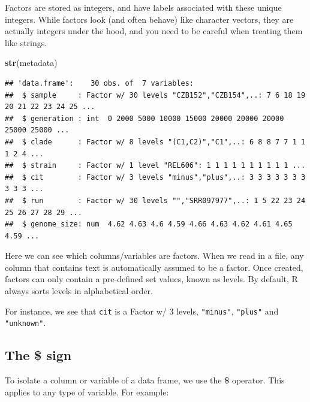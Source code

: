 \documentclass[]{book}
\newenvironment{Shaded}{\begin{snugshade}}{\end{snugshade}}
\newcommand{\KeywordTok}[1]{\textcolor[rgb]{0.13,0.29,0.53}{\textbf{#1}}}
\newcommand{\NormalTok}[1]{#1}
\newcommand{\OperatorTok}[1]{\textcolor[rgb]{0.81,0.36,0.00}{\textbf{#1}}}
\begin{document}
Factors are stored as integers, and have labels associated with these unique integers. While factors look (and often behave) like character vectors, they are actually integers under the hood, and you need to be careful when treating them like strings.

\begin{Shaded}
\begin{Highlighting}[]
\KeywordTok{str}\NormalTok{(metadata)}
\end{Highlighting}
\end{Shaded}

\begin{verbatim}
## 'data.frame':    30 obs. of  7 variables:
##  $ sample     : Factor w/ 30 levels "CZB152","CZB154",..: 7 6 18 19 20 21 22 23 24 25 ...
##  $ generation : int  0 2000 5000 10000 15000 20000 20000 20000 25000 25000 ...
##  $ clade      : Factor w/ 8 levels "(C1,C2)","C1",..: 6 8 8 7 7 1 1 1 2 4 ...
##  $ strain     : Factor w/ 1 level "REL606": 1 1 1 1 1 1 1 1 1 1 ...
##  $ cit        : Factor w/ 3 levels "minus","plus",..: 3 3 3 3 3 3 3 3 3 3 ...
##  $ run        : Factor w/ 30 levels "","SRR097977",..: 1 5 22 23 24 25 26 27 28 29 ...
##  $ genome_size: num  4.62 4.63 4.6 4.59 4.66 4.63 4.62 4.61 4.65 4.59 ...
\end{verbatim}

Here we can see which columns/variables are factors. When we read in a file, any column that contains text is automatically assumed to be a factor. Once created, factors can only contain a pre-defined set values, known as levels. By default, R always sorts levels in alphabetical order.

For instance, we see that \texttt{cit} is a Factor w/ 3 levels, \texttt{"minus"}, \texttt{"plus"} and \texttt{"unknown"}.

\hypertarget{the-sign}{%
\subsection*{The \$ sign}\label{the-sign}}

To isolate a column or variable of a data frame, we use the \textbf{\$} operator. This applies to any type of variable. For example:

\begin{Shaded}
\end{Shaded}
\end{document}
